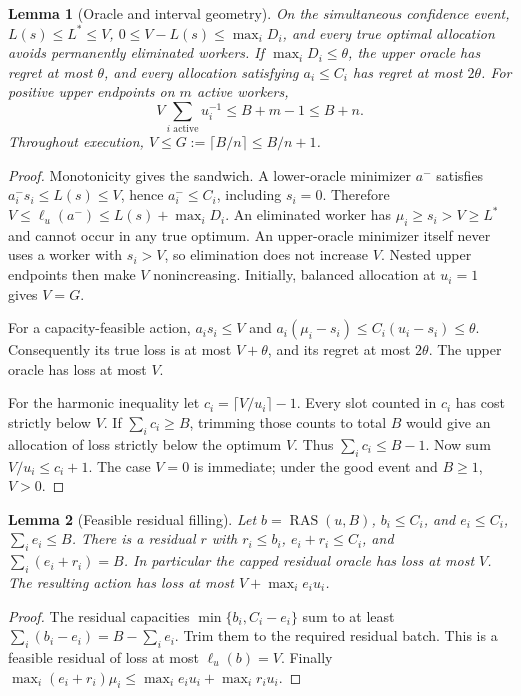 \documentclass[11pt]{article}
\newtheorem{lemma}{Lemma}
\begin{document}
\begin{lemma}[Oracle and interval geometry]
On the simultaneous confidence event, $L(s)\le L^*\le V$,
$0\le V-L(s)\le\max_i D_i$, and every true optimal allocation avoids permanently
eliminated workers. If $\max_i D_i\le\theta$, the upper oracle has regret at most
$\theta$, and every allocation satisfying $a_i\le C_i$ has regret at most $2\theta$.
For positive upper endpoints on $m$ active workers,
\[
 V\sum_{i\text{ active}}u_i^{-1}\le B+m-1\le B+n.
\]
Throughout execution, $V\le G:=\lceil B/n\rceil\le B/n+1$.
\end{lemma}
\begin{proof}
Monotonicity gives the sandwich. A lower-oracle minimizer $a^-$ satisfies
$a_i^-s_i\le L(s)\le V$, hence $a_i^-\le C_i$, including $s_i=0$. Therefore
$V\le\ell_u(a^-)\le L(s)+\max_iD_i$.
An eliminated worker has $\mu_i\ge s_i>V\ge L^*$ and cannot occur in any true
optimum. An upper-oracle minimizer itself never uses a worker with $s_i>V$,
so elimination does not increase $V$. Nested upper endpoints then make $V$
nonincreasing. Initially, balanced allocation at $u_i=1$ gives $V=G$.

For a capacity-feasible action, $a_is_i\le V$ and
$a_i(\mu_i-s_i)\le C_i(u_i-s_i)\le\theta$. Consequently its true loss is at most
$V+\theta$, and its regret at most $2\theta$. The upper oracle has loss at most $V$.

For the harmonic inequality let $c_i=\lceil V/u_i\rceil-1$. Every slot counted
in $c_i$ has cost strictly below $V$. If $\sum_i c_i\ge B$, trimming those counts
to total $B$ would give an allocation of loss strictly below the optimum $V$.
Thus $\sum_i c_i\le B-1$. Now sum $V/u_i\le c_i+1$.
The case $V=0$ is immediate; under the good event and $B\ge1$, $V>0$.
\end{proof}

\begin{lemma}[Feasible residual filling]
Let $b=\operatorname{RAS}(u,B)$, $b_i\le C_i$, and $e_i\le C_i$, $\sum_i e_i\le B$.
There is a residual $r$ with $r_i\le b_i$, $e_i+r_i\le C_i$, and
$\sum_i(e_i+r_i)=B$. In particular the capped residual oracle has loss at most $V$.
The resulting action has loss at most $V+\max_i e_i u_i$.
\end{lemma}
\begin{proof}
The residual capacities $\min\{b_i,C_i-e_i\}$ sum to at least
$\sum_i(b_i-e_i)=B-\sum_i e_i$. Trim them to the required residual batch.
This is a feasible residual of loss at most $\ell_u(b)=V$.
Finally $\max_i(e_i+r_i)\mu_i\le\max_i e_i u_i+\max_i r_i u_i$.
\end{proof}
\end{document}
